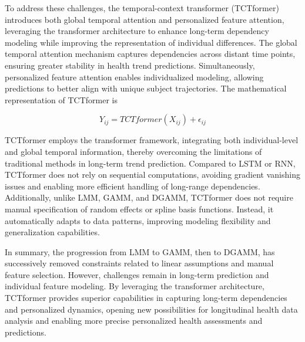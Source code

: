\documentclass[acmsmall]{acmart}
\begin{document}
To address these challenges, the temporal-context transformer (TCTformer) introduces both global temporal attention and personalized feature attention, leveraging the transformer architecture to enhance long-term dependency modeling while improving the representation of individual differences. The global temporal attention mechanism captures dependencies across distant time points, ensuring greater stability in health trend predictions. Simultaneously, personalized feature attention enables individualized modeling, allowing predictions to better align with unique subject trajectories. The mathematical representation of TCTformer is  

\[
Y_{ij} = TCTformer(X_{ij}) + \epsilon_{ij}
\]

TCTformer employs the transformer framework, integrating both individual-level and global temporal information, thereby overcoming the limitations of traditional methods in long-term trend prediction. Compared to LSTM or RNN, TCTformer does not rely on sequential computations, avoiding gradient vanishing issues and enabling more efficient handling of long-range dependencies. Additionally, unlike LMM, GAMM, and DGAMM, TCTformer does not require manual specification of random effects or spline basis functions. Instead, it automatically adapts to data patterns, improving modeling flexibility and generalization capabilities.  

In summary, the progression from LMM to GAMM, then to DGAMM, has successively removed constraints related to linear assumptions and manual feature selection. However, challenges remain in long-term prediction and individual feature modeling. By leveraging the transformer architecture, TCTformer provides superior capabilities in capturing long-term dependencies and personalized dynamics, opening new possibilities for longitudinal health data analysis and enabling more precise personalized health assessments and predictions.  
\end{document}
